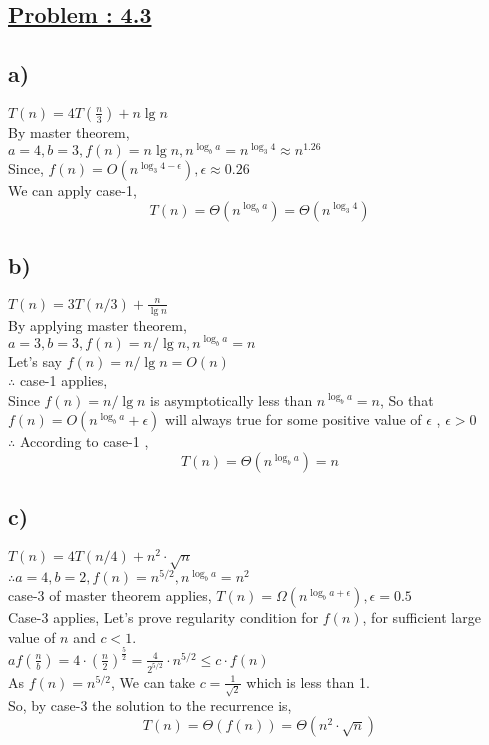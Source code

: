 \documentclass[a4paper, 11pt]{article}
\begin{document}
\subsection*{\underline{Problem : 4.3}}
\subsection*{a)}
$T(n)= 4T(\frac{n}{3}) + n\lg n$\\
By master theorem,\\
$a=4, b=3, f(n) = n \lg n, n^{\log_{b}a}=n^{\log_{3}4} \approx n^{1.26}$\\
Since, $f(n)=O(n^{\log_{3}4 - \epsilon}), \epsilon \approx 0.26$\\
We can apply case-1,
$$T(n) = \Theta (n^{\log_{b}a}) = \Theta(n^{\log_{3}4})$$

\subsection*{b)}
$T(n)= 3T(n/3) + \frac{n}{\lg n}$\\
By applying master theorem, \\
$a=3 , b=3, f(n) = n/ \lg n ,  n^{\log_{b}a} = n$\\
Let's say $f(n)= n/ \lg n = O(n)$\\
$\therefore$ case-1 applies,\\
Since $f(n) = n/ \lg n$ is asymptotically less than  $n^{\log_{b}a} = n$, So that $f(n) = O(n^{\log_{b}a}+\epsilon)$ will always true for some positive value of $\epsilon$ , $\epsilon > 0$\\
$\therefore$ According to case-1 ,
$$T(n) = \Theta ( n^{\log_{b}a}) = n $$

\subsection*{c)}
$T(n) = 4T(n/4) + n^2 \cdot \sqrt{n}$\\
$\therefore a=4, b=2, f(n)= n^{5/2} , n^{\log_{b}a} = n^2$\\
case-3 of master theorem applies,
$T(n) = \Omega(n^{\log_{b}a + \epsilon}) , \epsilon = 0.5$\\
Case-3 applies, Let's prove regularity condition for $f(n)$, for sufficient large value of $n$ and $c<1$.\\
$af(\frac{n}{b}) = 4\cdot(\frac{n}{2})^{\frac{5}{2}} = \frac{4}{2^{5/2}} \cdot n^{5/2} \le c \cdot f(n)$\\
As $f(n)=n^{5/2}$, We can take $c=\frac{1}{\sqrt{2}}$ which is less than 1.\\
So, by case-3 the solution to the recurrence is,
$$T(n) = \Theta (f(n)) = \Theta(n^2 \cdot \sqrt{n})$$
\end{document}

